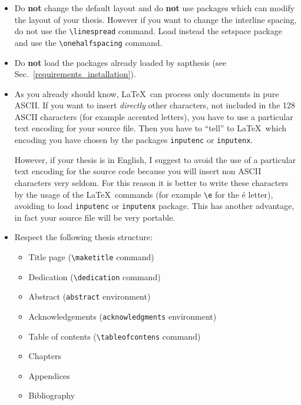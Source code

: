 \documentclass[a5paper,11pt]{article}
\newcommand{\bs}{\textbackslash}
\newcommand{\sq}{\textquotesingle}
\begin{document}
\begin{itemize}

\item Do \textbf{not} change the default layout and do \textbf{not} use packages which can modify the layout of your thesis. However if you want to change the interline spacing, do not use the \texttt{\bs linespread} command. Load instead the \textsf{setspace} package and use the \texttt{\bs onehalfspacing} command.

\item Do \textbf{not} load the packages already loaded by \textsf{sapthesis} (see Sec.~\ref{requirements_installation}).

\item As you already should know, \LaTeX\ can process only documents
in pure ASCII. If you want to insert \emph{directly} other characters, not included in the 128 ASCII
characters (for example accented letters), you have to use a particular text encoding for your source file. Then you have to ``tell'' to \LaTeX\ which encoding you have chosen by the packages \texttt{inputenc} or \texttt{inputenx}.

However, if your thesis is in English, I suggest to avoid the use of a particular text encoding for the source code because  you will insert non ASCII characters very seldom. For this reason it is better to write these characters by the usage of the \LaTeX\ commands (for example \texttt{\bs\sq e} for the \'e letter), avoiding to load \texttt{inputenc} or \texttt{inputenx} package. This has another advantage, in fact your source file will be very portable.

\item Respect the following thesis structure:

\begin{itemize}
\item Title page (\texttt{\bs maketitle} command)
\item Dedication (\texttt{\bs dedication} command)
\item Abstract (\texttt{abstract} environment)
\item Acknowledgements (\texttt{acknowledgments} environment)
\item Table of contents (\texttt{\bs tableofcontens} command)
\item Chapters
\item Appendices
\item Bibliography
\end{itemize}


\end{itemize}
\end{document}
